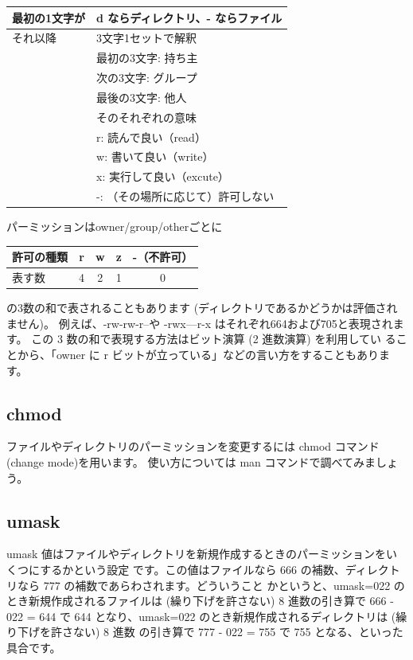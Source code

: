 \documentclass[a4j]{ltjreport}
\begin{document}
    \begin{table}[htb]
        \centering
          \begin{tabular}{|l|l|}  \hline
              最初の1文字が& d ならディレクトリ、- ならファイル  \\ \hline 
            それ以降 & 3文字1セットで解釈\\
              & 最初の3文字: 持ち主\\
              & 次の3文字: グループ\\
              & 最後の3文字: 他人\\\hline
             & そのそれぞれの意味   \\
             & r: 読んで良い（read）\\
             & w: 書いて良い（write）\\
             & x: 実行して良い（excute）\\
             & -: （その場所に応じて）許可しない\\ \hline
          \end{tabular}
    \end{table}

    \pagebreak
    パーミッションはowner/group/otherごとに

    \begin{table}[htb]
        \centering
          \begin{tabular}{|l|c|c|c|c|}  \hline
            許可の種類& r & w & z & -（不許可） \\ \hline 
            表す数 & 4 & 2 & 1 & 0 \\ \hline
          \end{tabular}
    \end{table}
    
    の3数の和で表されることもあります (ディレクトリであるかどうかは評価されません)。
    例えば、-rw-rw-r--や -rwx---r-x はそれぞれ664および705と表現されます。
    この 3 数の和で表現する方法はビット演算 (2 進数演算) を利用してい
    ることから、「owner に r ビットが立っている」などの言い方をすることもあります。

    \subsection{chmod}
    ファイルやディレクトリのパーミッションを変更するには chmod コマンド(change mode)を用います。
    使い方については man コマンドで調べてみましょう。

    \subsection{umask}
    umask 値はファイルやディレクトリを新規作成するときのパーミッションをいくつにするかという設定
    です。この値はファイルなら 666 の補数、ディレクトリなら 777 の補数であらわされます。どういうこと
    かというと、umask=022 のとき新規作成されるファイルは (繰り下げを許さない) 8 進数の引き算で 666 -
    022 = 644 で 644 となり、umask=022 のとき新規作成されるディレクトリは (繰り下げを許さない) 8 進数
    の引き算で 777 - 022 = 755 で 755 となる、といった具合です。
\end{document}
